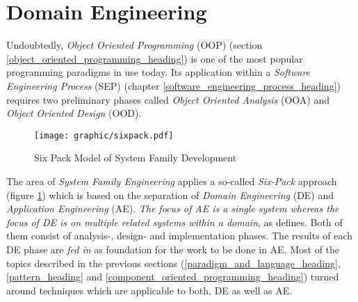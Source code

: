 %
%
%
%
%
%
%

\section{Domain Engineering}
\label{domain_engineering_heading}

Undoubtedly, \emph{Object Oriented Programming} (OOP) (section
\ref{object_oriented_programming_heading}) is one of the most popular programming
paradigms in use today. Its application within a \emph{Software Engineering Process}
(SEP) (chapter \ref{software_engineering_process_heading}) requires two preliminary
phases called \emph{Object Oriented Analysis} (OOA) and \emph{Object Oriented Design}
(OOD).

\begin{figure}[ht]
    \begin{center}
        \texttt{[image: graphic/sixpack.pdf]}
        \caption{Six Pack Model of System Family Development \cite{domainengg, esaps}}
        \label{sixpack_figure}
    \end{center}
\end{figure}

The area of \emph{System Family Engineering} applies a so-called \emph{Six-Pack}
approach (figure \ref{sixpack_figure}) which is based on the separation of
\emph{Domain Engineering} (DE) and \emph{Application Engineering} (AE).
\textit{The focus of AE is a single system whereas the focus of DE is on
multiple related systems within a domain}, as \cite{domainengg} defines. Both of
them consist of analysis-, design- and implementation phases. The results of
each DE phase are \emph{fed in} as foundation for the work to be done in AE.
Most of the topics described in the previous sections
(\ref{paradigm_and_language_heading}, \ref{pattern_heading} and
\ref{component_oriented_programming_heading}) turned around techniques which
are applicable to both, DE as well as AE.

